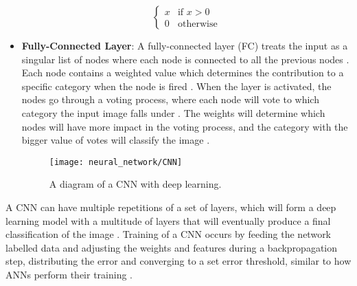 \begin{itemize}
\begin{equation}
	\begin{cases}
	x & \text{if $x > 0 $} \\
	0 & \text{otherwise}
	\end{cases}
	\end{equation} 
	\item\textbf{Fully-Connected Layer}: A fully-connected layer (FC) treats the input as a singular list of nodes \cite{rohrer_2016} where each node is connected to all the previous nodes \cite{karpathy_2018}. Each node contains a weighted value which determines the contribution to a specific category when the node is fired \cite{rohrer_2016}. When the layer is activated, the nodes go through a voting process, where each node will vote to which category the input image falls under \cite{rohrer_2016}. The weights will determine which nodes will have more impact in the voting process, and the category with the bigger value of votes will classify the image \cite{rohrer_2016, karpathy_2018}.
	
	\begin{figure}[h]
		\texttt{[image: neural\_network/CNN]}%
		\caption{A diagram of a CNN with deep learning.}%
		\label{fig:cnnfig}%
	\end{figure}
\end{itemize}

A CNN can have multiple repetitions of a set of layers, which will form a deep learning model with a multitude of layers that will eventually produce a final classification of the image \cite{NIPS2012_4824, DBLP:journals/corr/KalchbrennerGB14}. Training of a CNN occurs by feeding the network labelled data and adjusting the weights and features during a backpropagation step, distributing the error and converging to a set error threshold, similar to how ANNs perform their training \cite{DBLP:journals/corr/KalchbrennerGB14,rohrer_2016,karpathy_2018}.
